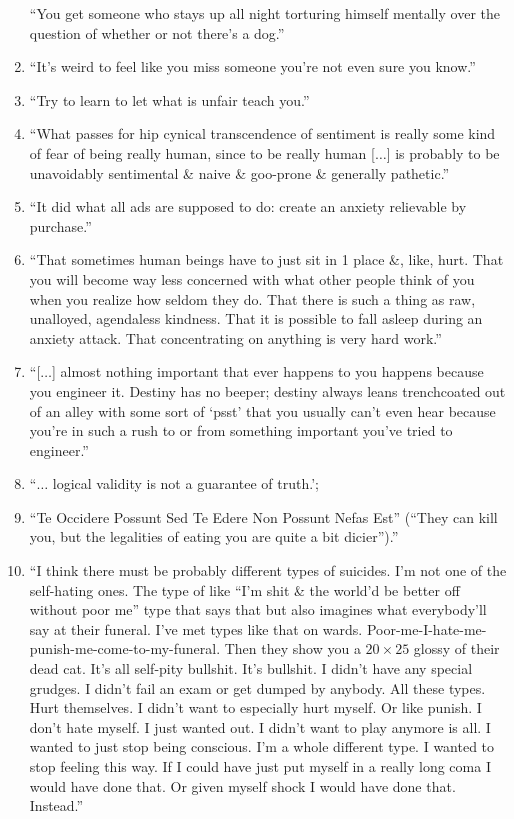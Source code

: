 \documentclass{article}
\numberwithin{equation}{section}
\begin{document}
\begin{enumerate}
	``You get someone who stays up all night torturing himself mentally over the question of whether or not there's a dog.''
	\item ``It's weird to feel like you miss someone you're not even sure you know.''
	\item ``Try to learn to let what is unfair teach you.''
	\item ``What passes for hip cynical transcendence of sentiment is really some kind of fear of being really human, since to be really human [$\ldots$] is probably to be unavoidably sentimental \& naive \& goo-prone \& generally pathetic.''
	\item ``It did what all ads are supposed to do: create an anxiety relievable by purchase.''
	\item ``That sometimes human beings have to just sit in 1 place \&, like, hurt. That you will become way less concerned with what other people think of you when you realize how seldom they do. That there is such a thing as raw, unalloyed, agendaless kindness. That it is possible to fall asleep during an anxiety attack. That concentrating on anything is very hard work.''
	\item ``[$\ldots$] almost nothing important that ever happens to you happens because you engineer it. Destiny has no beeper; destiny always leans trenchcoated out of an alley with some sort of `psst' that you usually can't even hear because you're in such a rush to or from something important you've tried to engineer.''
	\item ``$\ldots$ logical validity is not a guarantee of truth.';
	\item ``Te Occidere Possunt Sed Te Edere Non Possunt Nefas Est'' (``They can kill you, but the legalities of eating you are quite a bit dicier'').''
	\item ``I think there must be probably different types of suicides. I'm not one of the self-hating ones. The type of like ``I'm shit \& the world'd be better off without poor me'' type that says that but also imagines what everybody'll say at their funeral. I've met types like that on wards. Poor-me-I-hate-me-punish-me-come-to-my-funeral. Then they show you a $20\times25$ glossy of their dead cat. It's all self-pity bullshit. It's bullshit. I didn't have any special grudges. I didn't fail an exam or get dumped by anybody. All these types. Hurt themselves. I didn't want to especially hurt myself. Or like punish. I don't hate myself. I just wanted out. I didn't want to play anymore is all. I wanted to just stop being conscious. I'm a whole different type. I wanted to stop feeling this way. If I could have just put myself in a really long coma I would have done that. Or given myself shock I would have done that. Instead.''

\end{enumerate}
\end{document}
